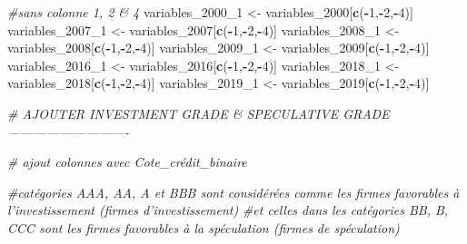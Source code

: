 \documentclass[
]{article}
\newenvironment{Shaded}{\begin{snugshade}}{\end{snugshade}}
\newcommand{\CommentTok}[1]{\textcolor[rgb]{0.56,0.35,0.01}{\textit{#1}}}
\newcommand{\DecValTok}[1]{\textcolor[rgb]{0.00,0.00,0.81}{#1}}
\newcommand{\KeywordTok}[1]{\textcolor[rgb]{0.13,0.29,0.53}{\textbf{#1}}}
\newcommand{\NormalTok}[1]{#1}
\newcommand{\OperatorTok}[1]{\textcolor[rgb]{0.81,0.36,0.00}{\textbf{#1}}}
\newcommand{\StringTok}[1]{\textcolor[rgb]{0.31,0.60,0.02}{#1}}
\begin{document}
\begin{Shaded}
\begin{Highlighting}[]
\CommentTok{#sans colonne 1, 2 & 4}
\NormalTok{variables_}\DecValTok{2000}\NormalTok{_}\DecValTok{1}\NormalTok{ <-}\StringTok{ }\NormalTok{variables_}\DecValTok{2000}\NormalTok{[}\KeywordTok{c}\NormalTok{(}\OperatorTok{-}\DecValTok{1}\NormalTok{,}\OperatorTok{-}\DecValTok{2}\NormalTok{,}\OperatorTok{-}\DecValTok{4}\NormalTok{)]}
\NormalTok{variables_}\DecValTok{2007}\NormalTok{_}\DecValTok{1}\NormalTok{ <-}\StringTok{ }\NormalTok{variables_}\DecValTok{2007}\NormalTok{[}\KeywordTok{c}\NormalTok{(}\OperatorTok{-}\DecValTok{1}\NormalTok{,}\OperatorTok{-}\DecValTok{2}\NormalTok{,}\OperatorTok{-}\DecValTok{4}\NormalTok{)]}
\NormalTok{variables_}\DecValTok{2008}\NormalTok{_}\DecValTok{1}\NormalTok{ <-}\StringTok{ }\NormalTok{variables_}\DecValTok{2008}\NormalTok{[}\KeywordTok{c}\NormalTok{(}\OperatorTok{-}\DecValTok{1}\NormalTok{,}\OperatorTok{-}\DecValTok{2}\NormalTok{,}\OperatorTok{-}\DecValTok{4}\NormalTok{)]}
\NormalTok{variables_}\DecValTok{2009}\NormalTok{_}\DecValTok{1}\NormalTok{ <-}\StringTok{ }\NormalTok{variables_}\DecValTok{2009}\NormalTok{[}\KeywordTok{c}\NormalTok{(}\OperatorTok{-}\DecValTok{1}\NormalTok{,}\OperatorTok{-}\DecValTok{2}\NormalTok{,}\OperatorTok{-}\DecValTok{4}\NormalTok{)]}
\NormalTok{variables_}\DecValTok{2016}\NormalTok{_}\DecValTok{1}\NormalTok{ <-}\StringTok{ }\NormalTok{variables_}\DecValTok{2016}\NormalTok{[}\KeywordTok{c}\NormalTok{(}\OperatorTok{-}\DecValTok{1}\NormalTok{,}\OperatorTok{-}\DecValTok{2}\NormalTok{,}\OperatorTok{-}\DecValTok{4}\NormalTok{)]}
\NormalTok{variables_}\DecValTok{2018}\NormalTok{_}\DecValTok{1}\NormalTok{ <-}\StringTok{ }\NormalTok{variables_}\DecValTok{2018}\NormalTok{[}\KeywordTok{c}\NormalTok{(}\OperatorTok{-}\DecValTok{1}\NormalTok{,}\OperatorTok{-}\DecValTok{2}\NormalTok{,}\OperatorTok{-}\DecValTok{4}\NormalTok{)]}
\NormalTok{variables_}\DecValTok{2019}\NormalTok{_}\DecValTok{1}\NormalTok{ <-}\StringTok{ }\NormalTok{variables_}\DecValTok{2019}\NormalTok{[}\KeywordTok{c}\NormalTok{(}\OperatorTok{-}\DecValTok{1}\NormalTok{,}\OperatorTok{-}\DecValTok{2}\NormalTok{,}\OperatorTok{-}\DecValTok{4}\NormalTok{)]}









\CommentTok{# AJOUTER INVESTMENT GRADE & SPECULATIVE GRADE ----------------------------}


\CommentTok{# ajout colonnes avec Cote_crédit_binaire}


\CommentTok{#catégories AAA, AA, A et BBB sont considérées comme les firmes favorables à l'investissement (firmes d'investissement) }
\CommentTok{#et celles dans les catégories BB, B, CCC sont les firmes favorables à la spéculation (firmes de spéculation)}



\end{Highlighting}
\end{Shaded}
\end{document}
